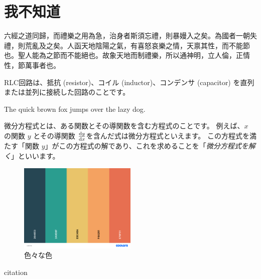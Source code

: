\section{我不知道}

六經之道同歸，而禮樂之用為急，治身者斯須忘禮，則暴嫚入之矣。為國者一朝失禮，則荒亂及之矣。人函天地陰陽之氣，有喜怒哀樂之情，天禀其性，而不能節也。聖人能為之節而不能絕也。故象天地而制禮樂，所以通神明，立人倫，正情性，節萬事者也。

RLC回路は、抵抗 (resistor)、コイル (inductor)、コンデンサ (capacitor) を直列または並列に接続した回路のことです。

The quick brown fox jumps over the lazy dog.

微分方程式とは、ある関数とその導関数を含む方程式のことです。
例えば、\(x\) の関数 \(y\) とその導関数 \(\dv{y}{x}\)を含んだ式は微分方程式といえます。
この方程式を満たす「関数 \(y\)」がこの方程式の解であり、これを求めることを「\emph{微分方程式を解く}」といいます。

\begin{figure}[htb]
	\centering
	\includegraphics[width=0.5\textwidth]{colors.png}
	\caption{色々な色}
	\label{fig:colors}
\end{figure}

citation \cite{sizesuu}
